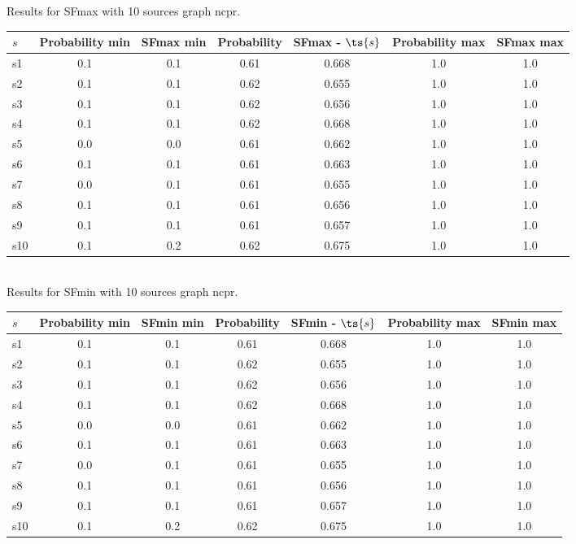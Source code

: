 \documentclass{article}
\begin{document}
\noindent Results for SFmax with 10 sources graph ncpr.

\noindent\begin{tabular}{|l|c|c|c|c|c|c|}
\hline
$s$& Probability min & SFmax min & Probability & SFmax - $\ts{s}$ & Probability max & SFmax max\\
\hline
s1 &0.1 & 0.1 & 0.61 & 0.668 & 1.0 & 1.0\\
\hline
s2 &0.1 & 0.1 & 0.62 & 0.655 & 1.0 & 1.0\\
\hline
s3 &0.1 & 0.1 & 0.62 & 0.656 & 1.0 & 1.0\\
\hline
s4 &0.1 & 0.1 & 0.62 & 0.668 & 1.0 & 1.0\\
\hline
s5 &0.0 & 0.0 & 0.61 & 0.662 & 1.0 & 1.0\\
\hline
s6 &0.1 & 0.1 & 0.61 & 0.663 & 1.0 & 1.0\\
\hline
s7 &0.0 & 0.1 & 0.61 & 0.655 & 1.0 & 1.0\\
\hline
s8 &0.1 & 0.1 & 0.61 & 0.656 & 1.0 & 1.0\\
\hline
s9 &0.1 & 0.1 & 0.61 & 0.657 & 1.0 & 1.0\\
\hline
s10 &0.1 & 0.2 & 0.62 & 0.675 & 1.0 & 1.0\\
\hline
\end{tabular}\\

\noindent Results for SFmin with 10 sources graph ncpr.

\noindent\begin{tabular}{|l|c|c|c|c|c|c|}
\hline
$s$& Probability min & SFmin min & Probability & SFmin - $\ts{s}$ & Probability max & SFmin max\\
\hline
s1 &0.1 & 0.1 & 0.61 & 0.668 & 1.0 & 1.0\\
\hline
s2 &0.1 & 0.1 & 0.62 & 0.655 & 1.0 & 1.0\\
\hline
s3 &0.1 & 0.1 & 0.62 & 0.656 & 1.0 & 1.0\\
\hline
s4 &0.1 & 0.1 & 0.62 & 0.668 & 1.0 & 1.0\\
\hline
s5 &0.0 & 0.0 & 0.61 & 0.662 & 1.0 & 1.0\\
\hline
s6 &0.1 & 0.1 & 0.61 & 0.663 & 1.0 & 1.0\\
\hline
s7 &0.0 & 0.1 & 0.61 & 0.655 & 1.0 & 1.0\\
\hline
s8 &0.1 & 0.1 & 0.61 & 0.656 & 1.0 & 1.0\\
\hline
s9 &0.1 & 0.1 & 0.61 & 0.657 & 1.0 & 1.0\\
\hline
s10 &0.1 & 0.2 & 0.62 & 0.675 & 1.0 & 1.0\\
\hline
\end{tabular}\\
\end{document}
